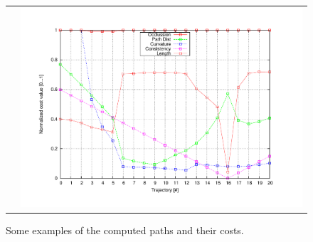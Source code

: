 \begin{figure}[h!]
\begin{tabular}{cc}
\begin{minipage}{.45\textwidth}
    \end{minipage} &
    \begin{minipage}{.45\textwidth}
      \centering
      \includegraphics[width=\textwidth,trim=50 40 80 60,clip]{costs17}\label{fig:cp07_example9}
    \end{minipage}
    \end{tabular} 
    \caption{Some examples of the computed paths and their costs.}\label{fig:cp07_examples}
\end{figure}

